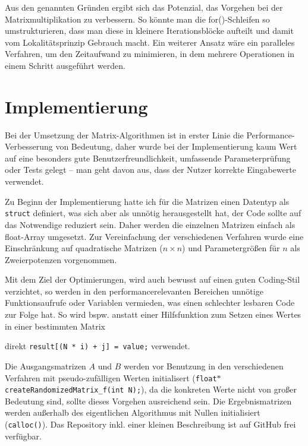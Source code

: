 \documentclass[a4paper,11pt]{scrartcl}
\newcommand{\bspw}{\mbox{bspw.}\xspace}
\newcommand{\inkl}{\mbox{inkl.}\xspace}
\begin{document}
Aus den genannten Gründen ergibt sich das Potenzial, das Vorgehen bei der Matrixmultiplikation
zu verbessern. So könnte man die for()-Schleifen so umstrukturieren, dass man diese in kleinere
Iterationsblöcke aufteilt und damit vom Lokalitätsprinzip Gebrauch macht. Ein weiterer Ansatz wäre
ein paralleles Verfahren, um den Zeitaufwand zu minimieren, in dem mehrere Operationen in einem
Schritt ausgeführt werden.

\section{Implementierung}
Bei der Umsetzung der Matrix-Algorithmen ist in erster Linie die Performance-Verbesserung 
von Bedeutung, daher wurde bei der Implementierung kaum Wert auf eine besonders
gute Benutzerfreundlichkeit, umfassende Parameterprüfung oder Tests gelegt --
man geht davon aus, dass der Nutzer korrekte Eingabewerte verwendet.\newline

Zu Beginn der Implementierung hatte ich für die Matrizen einen Datentyp als
\texttt{struct} definiert, was sich aber als unnötig herausgestellt hat, der
Code sollte auf das Notwendige reduziert sein. Daher werden die einzelnen 
Matrizen einfach als float-Array umgesetzt. Zur Vereinfachung der verschiedenen
Verfahren wurde eine Einschränkung auf quadratische Matrizen ($n \times n$) 
und Parametergrößen für $n$ als Zweierpotenzen vorgenommen.\newline

Mit dem Ziel der Optimierungen, wird auch bewusst auf einen guten Coding-Stil verzichtet,
so werden in den performancerelevanten Bereichen unnötige Funktionsaufrufe oder Variablen vermieden, was einen schlechter lesbaren Code zur Folge hat. So wird \bspw anstatt einer
Hilfsfunktion zum Setzen eines Wertes in einer bestimmten Matrix


direkt \texttt{result[(N * i) + j] = value;} verwendet.\newline

Die Ausgangsmatrizen $A$ und $B$
werden vor Benutzung in den verschiedenen Verfahren mit pseudo-zufälligen Werten initialisert
(\texttt{float$*$ createRandomizedMatrix\_f(int N);}), da die konkreten Werte nicht von großer Bedeutung sind, sollte dieses Vorgehen ausreichend sein. Die Ergebnismatrizen werden außerhalb des eigentlichen
Algorithmus mit Nullen initialisiert (\texttt{calloc()}). Das Repository \inkl einer kleinen
Beschreibung ist auf GitHub \cite{ghub} frei verfügbar.
\end{document}
